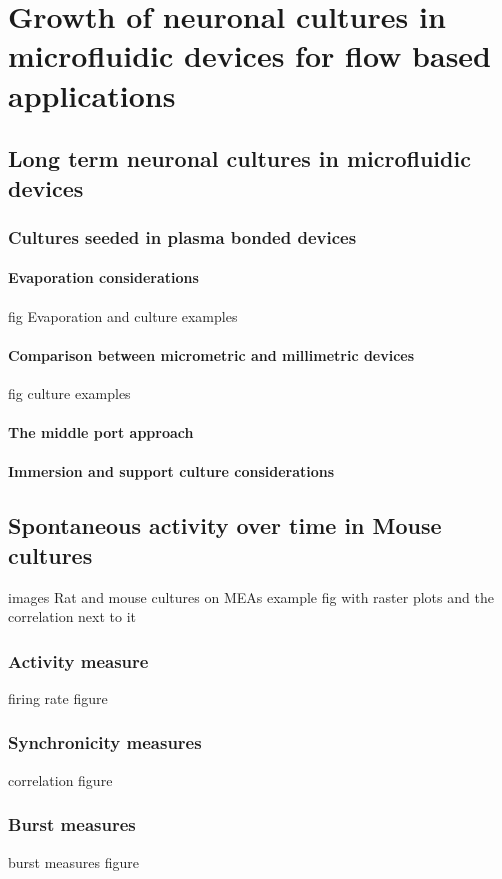 \chapter{Growth of neuronal cultures in microfluidic devices for flow based applications}
\label{chap:devicesAndFlow}


\section{Long term neuronal cultures in microfluidic devices}
    \subsection{Cultures seeded in plasma bonded devices}
        \subsubsection{Evaporation considerations}
        fig Evaporation and culture examples
        \subsubsection{Comparison between micrometric and millimetric devices}
        fig culture examples
        \subsubsection{The middle port approach}
        \subsubsection{Immersion and support culture considerations}
        
\section{Spontaneous activity over time in Mouse cultures}
        images Rat and mouse cultures on MEAs
        example fig with raster plots and the correlation next to it
        \subsection{Activity measure}
        firing rate figure
        \subsection{Synchronicity measures}
        correlation figure
        \subsection{Burst measures}
        burst measures figure
